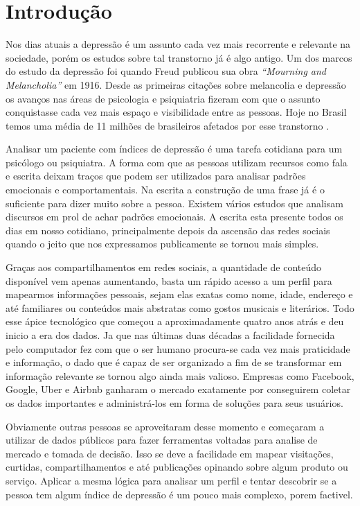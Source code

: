 \chapter*[Introdução]{Introdução}

Nos dias atuais a depressão é um assunto cada vez mais recorrente e relevante na sociedade, porém os estudos sobre tal transtorno já é algo antigo. Um dos marcos do estudo da depressão foi quando Freud publicou sua obra \textit{“Mourning and Melancholia”} em 1916. Desde as primeiras citações sobre melancolia e depressão os avanços nas áreas de psicologia e psiquiatria fizeram com que o assunto conquistasse cada vez mais espaço e visibilidade entre as pessoas. Hoje no Brasil temos uma média de 11 milhões de brasileiros afetados por esse transtorno \cite{paho2017-letstalk}.

Analisar um paciente com índices de depressão é uma tarefa cotidiana para um psicólogo ou psiquiatra. A forma com que as pessoas utilizam recursos como fala e escrita deixam traços que podem ser utilizados para analisar padrões emocionais e comportamentais. Na escrita a construção de uma frase já é o suficiente para dizer muito sobre a pessoa. Existem vários estudos que analisam discursos em prol de achar padrões emocionais. A escrita esta presente todos os dias em nosso cotidiano, principalmente depois da ascensão das redes sociais quando o jeito que nos expressamos publicamente se tornou mais simples.

Graças aos compartilhamentos em redes sociais, a quantidade de conteúdo disponível vem apenas aumentando, basta um rápido acesso a um perfil para mapearmos informações pessoais, sejam elas exatas como nome, idade, endereço e até familiares ou conteúdos mais abstratas como gostos musicais e literários. Todo esse ápice tecnológico que começou a aproximadamente quatro anos atrás e deu inicio a era dos dados. Ja que nas últimas duas décadas a facilidade fornecida pelo computador fez com que o ser humano procura-se cada vez mais praticidade e informação, o dado que é capaz de ser organizado a fim de se transformar em informação relevante se tornou algo ainda mais valioso. Empresas como Facebook, Google, Uber e Airbnb ganharam o mercado exatamente por conseguirem coletar os dados importantes e administrá-los em forma de soluções para seus usuários.

Obviamente outras pessoas se aproveitaram desse momento e começaram a utilizar de dados públicos para fazer ferramentas voltadas para analise de mercado e tomada de decisão. Isso se deve a facilidade em mapear visitações, curtidas, compartilhamentos e até publicações opinando sobre algum produto ou serviço. Aplicar a mesma lógica para analisar um perfil e tentar descobrir se a pessoa tem algum índice de depressão é um pouco mais complexo, porem factivel.

